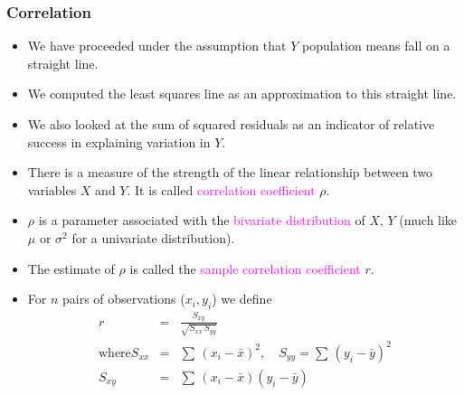 \documentclass[xcolor=dvipsnames,12pt]{beamer}
\begin{document}
\begin{frame}
\frametitle{Correlation}
\begin{itemize}
\item  We have proceeded under the assumption that $Y$ population means
fall on a straight line.\\[.05in]
\item  We computed the least squares line as
an approximation to this straight line. \\[.05in] 
\item We also looked at the
sum of squared residuals as an indicator of relative success in
explaining variation in $Y$.\\[.05in]
\item There is a measure of the strength of the linear relationship
between two variables $X$ and $Y$.  It is called
\textcolor{magenta}{correlation coefficient} $\rho$.\\[.05in]
\item  $\rho$ is a parameter associated with the \textcolor{magenta}{bivariate distribution}  of  $X,\,Y$ (much like $\mu$ or $\sigma^2$ for a univariate distribution).
\end{itemize}
\end{frame}




\begin{frame}
\begin{itemize}
\item The  estimate of $\rho$ is
called the \textcolor{magenta}{sample correlation coefficient} $r$.\\[.1in]
\item For $n$ pairs of observations ($x_i, y_i$) we define
\begin{eqnarray*}
  r & = & \frac{S_{xy}}{\sqrt{S_{xx}\,S_{yy}}}\\[.1in]
\mbox{where}  S_{xx}  & = & \displaystyle\sum\,(x_i - \bar{x})^2,
  \quad S_{yy} = \displaystyle\sum\,(y_i - \bar{y})^2 \\
  S_{xy} & = & \displaystyle\sum\, (x_i - \bar{x})(y_i - \bar{y})
\end{eqnarray*}
\end{itemize}
\end{frame}
\end{document}
